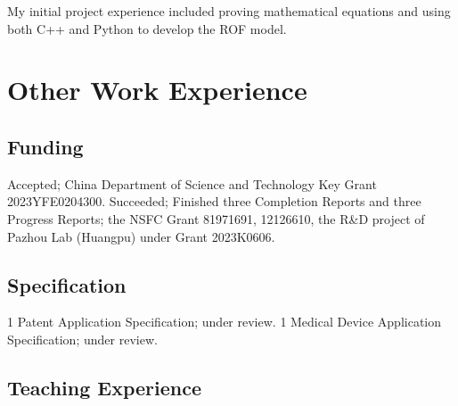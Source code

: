 \documentclass[11pt,a4paper, final]{moderncv}
\newcommand{\spacesection}{\vspace{0.4cm}}
\newcommand{\spacesubsection}{\vspace{0.2cm}}
\begin{document}
	{My initial project experience included proving mathematical equations and using both C++ and Python to develop the ROF model.}
\section{\textbf{Other Work Experience}}
	\subsection{\textbf{Funding}}
		{Accepted; China Department of Science and Technology Key Grant 2023YFE0204300.}
		{Succeeded; Finished three Completion Reports and three Progress Reports; the NSFC Grant 81971691, 12126610, 
		the R\&D project of Pazhou Lab (Huangpu) under Grant 2023K0606.}
	\subsection{\textbf{Specification}}
		{1 Patent Application Specification; under review.}
		{1 Medical Device Application Specification; under review.}
	\subsection{\textbf{Teaching Experience}}
\end{document}
